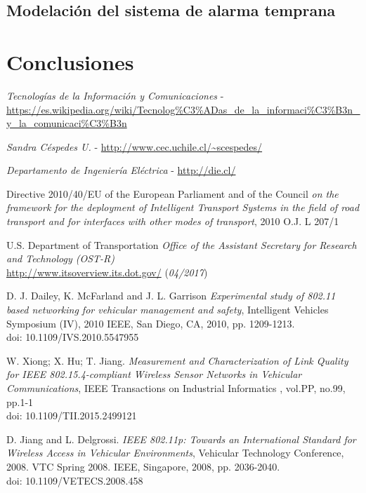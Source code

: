 \documentclass[11pt,letterpaper]{article}
\begin{document}
\newpage
\subsection{Modelación del sistema de alarma temprana}
\newpage
\section{Conclusiones}
\newpage
\begin{thebibliography}{5}
     \emph{Tecnologías de la Información y Comunicaciones} - \url{https://es.wikipedia.org/wiki/Tecnolog%C3%ADas_de_la_informaci%C3%B3n_y_la_comunicaci%C3%B3n}

     \emph{Sandra Céspedes U.} - \url{http://www.cec.uchile.cl/~scespedes/}

     \emph{Departamento de Ingeniería Eléctrica} - \url{http://die.cl/}

  		 Directive 2010/40/EU of the European Parliament and of the Council
  		\textit{on the framework for the deployment of Intelligent Transport Systems in the field of road transport and for interfaces with other modes of transport},
  		2010 O.J. L 207/1

  		 U.S. Department of Transportation
  		\textit{Office of the Assistant Secretary for Research and Technology (OST-R)}
  		\\\url{http://www.itsoverview.its.dot.gov/} (\textit{04/2017})

  		 D. J. Dailey, K. McFarland and J. L. Garrison
  		\textit{Experimental study of 802.11 based networking for vehicular management and safety},
  		Intelligent Vehicles Symposium (IV), 2010 IEEE, San Diego, CA, 2010, pp. 1209-1213.
  		\\doi: 10.1109/IVS.2010.5547955


  		 W. Xiong; X. Hu; T. Jiang.
  		\textit{Measurement and Characterization of Link Quality for IEEE 802.15.4-compliant Wireless Sensor Networks in Vehicular Communications},
  		IEEE Transactions on Industrial Informatics , vol.PP, no.99, pp.1-1
  		\\doi: 10.1109/TII.2015.2499121

  		 D. Jiang and L. Delgrossi.
  		\textit{IEEE 802.11p: Towards an International Standard for Wireless Access in Vehicular Environments}, Vehicular Technology Conference, 2008. VTC Spring 2008. IEEE, Singapore, 2008, pp. 2036-2040.
  		\\doi: 10.1109/VETECS.2008.458


\end{thebibliography}
\end{document}
